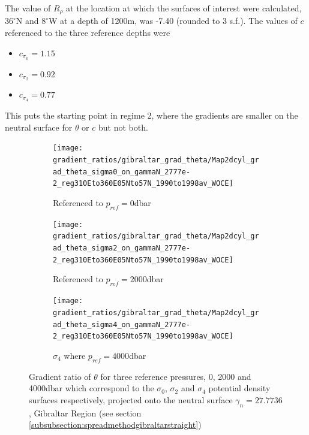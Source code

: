 The value of $R_\rho$ at the location at which the surfaces of interest were calculated, $36^{\circ}$N and $8^{\circ}$W at a depth of 1200m, was -7.40 (rounded to 3 s.f.). The values of $c$ referenced to the three reference depths were 

\begin{itemize}
    \item $c_{\sigma_0} = 1.15$
    \item $c_{\sigma_2} = 0.92$
    \item $c_{\sigma_4} = 0.77$
\end{itemize}

This puts the starting point in regime 2, where the gradients are smaller on the neutral surface for $\theta$ or $c$ but not both.

\begin{figure}[htbp]
    \centering
     
     \begin{subfigure}{0.4\textwidth}
         
         \texttt{[image: gradient\_ratios/gibraltar\_grad\_theta/Map2dcyl\_grad\_theta\_sigma0\_on\_gammaN\_2777e-2\_reg310Eto360E05Nto57N\_1990to1998av\_WOCE]}
         \caption{Referenced to $p_{ref} = 0$dbar}
         \label{fig:subplot_gibraltar_grad_theta_sig0}
     \end{subfigure}
     \begin{subfigure}{0.4\textwidth}
         
         \texttt{[image: gradient\_ratios/gibraltar\_grad\_theta/Map2dcyl\_grad\_theta\_sigma2\_on\_gammaN\_2777e-2\_reg310Eto360E05Nto57N\_1990to1998av\_WOCE]}
         \caption{Referenced to $p_{ref} = 2000$dbar}
         \label{fig:subplot_gibraltar_grad_theta_sig2}
     \end{subfigure}
     
     \begin{subfigure}{0.4\textwidth}
         
         \texttt{[image: gradient\_ratios/gibraltar\_grad\_theta/Map2dcyl\_grad\_theta\_sigma4\_on\_gammaN\_2777e-2\_reg310Eto360E05Nto57N\_1990to1998av\_WOCE]}
         \caption{$\sigma_4$ where $p_{ref} = 4000$dbar}
         \label{fig:subplot_gibraltar_grad_theta_sig4}
     \end{subfigure}
    \caption{Gradient ratio of $\theta$ for three reference pressures, 0, 2000 and 4000dbar which correspond to the $\sigma_0$, $\sigma_2$ and $\sigma_4$ potential density surfaces respectively, projected onto the neutral surface $\gamma_n = 27.7736$, Gibraltar Region (see section \ref{subsubsection:spreadmethodgibraltarstraight})}
    \label{fig:gibraltar_grad_theta}
    
\end{figure}


